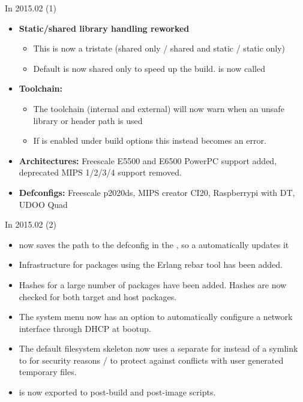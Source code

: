 \begin{frame}{In 2015.02 (1)}
  \begin{itemize}
  \item {\bf Static/shared library handling reworked}
    \begin{itemize}
    \item This is now a tristate (shared only / shared and static /
      static only)
    \item Default is now shared only to speed up the
      build.  is now called
    \end{itemize}
  \item {\bf Toolchain:}
    \begin{itemize}
    \item The toolchain (internal and external) will now warn when an
      unsafe library or header path is used
    \item If  is enabled under
      build options this instead becomes an error.
    \end{itemize}
  \item {\bf Architectures:} Freescale E5500 and E6500 PowerPC support
    added, deprecated MIPS 1/2/3/4 support removed.
  \item {\bf Defconfigs:} Freescale p2020ds, MIPS creator CI20,
    Raspberrypi with DT, UDOO Quad
  \end{itemize}
\end{frame}

\begin{frame}{In 2015.02 (2)}
  \begin{itemize}
  \item {} now saves the path to the
    defconfig in the , so a 
    automatically updates it
  \item Infrastructure for packages using the Erlang rebar tool has
    been added.
  \item Hashes for a large number of packages have been added. Hashes
    are now checked for both target and host packages.
  \item The system menu now has an option to automatically configure a
    network interface through DHCP at bootup.
  \item The default filesystem skeleton now uses a separate
     for  instead of a symlink to 
    for security reasons / to protect against conflicts with user
    generated temporary files.
  \item {} is now exported to post-build and
    post-image scripts.
  \end{itemize}
\end{frame}

